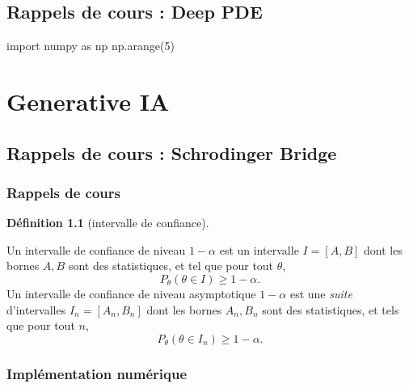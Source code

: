 \documentclass[
  10,
  letterpaper,
  DIV=11,
  numbers=noendperiod]{scrreport}
\theoremstyle{definition}
\newtheorem{definition}{Définition}[chapter]
\theoremstyle{remark}
\begin{document}
\chapter{Rappels de cours : Deep PDE}\label{rappels-de-cours-deep-pde}

import numpy as np np.arange(5)

\chapter{}\label{section-1}

\part{Generative IA}

\chapter{Rappels de cours : Schrodinger
Bridge}\label{rappels-de-cours-schrodinger-bridge}

\section{Rappels de cours}\label{rappels-de-cours}

\begin{definition}[intervalle de
confiance]\protect\hypertarget{def-ic}{}\label{def-ic}

Un intervalle de confiance de niveau \(1-\alpha\) est un intervalle
\(I = [A,B]\) dont les bornes \(A,B\) sont des statistiques, et tel que
pour tout \(\theta\), \[P_\theta(\theta \in I) \geqslant 1 - \alpha.\]
Un intervalle de confiance de niveau asymptotique \(1-\alpha\) est une
\emph{suite} d'intervalles \(I_n = [A_n,B_n]\) dont les bornes
\(A_n,B_n\) sont des statistiques, et tels que pour tout \(n\),
\[ P_\theta(\theta \in I_n) \geqslant 1 - \alpha.\]

\end{definition}

\section{Implémentation numérique}\label{impluxe9mentation-numuxe9rique}
\end{document}
